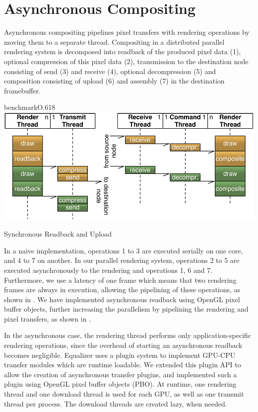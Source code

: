 \section{Asynchronous Compositing}

Asynchronous compositing pipelines pixel transfers with rendering operations by
moving them to a separate thread. Compositing in a distributed parallel
rendering system is decomposed into readback of the produced pixel data (1),
optional compression of this pixel data (2), transmission to the destination
node consisting of send (3) and receive (4), optional decompression (5) and
composition consisting of upload (6) and assembly (7) in the destination
framebuffer.

\begin{wrapfloat}{benchmark}{O}{.618\textwidth}
 \includegraphics[width=.618\textwidth]{images/syncReadback}
 {\caption{\label{fSyncRB}Synchronous Readback and Upload}}
\end{wrapfloat}

In a naive implementation, operations 1 to 3 are executed serially on one
core, and 4 to 7 on another. In our parallel rendering system, operations 2
to 5 are executed asynchronously to the rendering and operations 1, 6 and 7.
Furthermore, we use a latency of one frame which means that two rendering frames
are always in execution, allowing the pipelining of these operations, as shown
in . We have implemented asynchronous readback using OpenGL pixel
buffer objects, further increasing the parallelism by pipelining the rendering
and pixel transfers, as shown in .

In the asynchronous case, the rendering thread performs only
application-specific rendering operations, since the overhead of starting an
asynchronous readback becomes negligible. Equalizer uses a plugin system to
implement GPU-CPU transfer modules which are runtime loadable. We extended this
plugin API to allow the creation of asynchronous transfer plugins, and
implemented such a plugin using OpenGL pixel buffer objects (PBO). At runtime,
one rendering thread and one download thread is used for each GPU, as well as
one transmit thread per process. The download threads are created lazy, when
needed.

